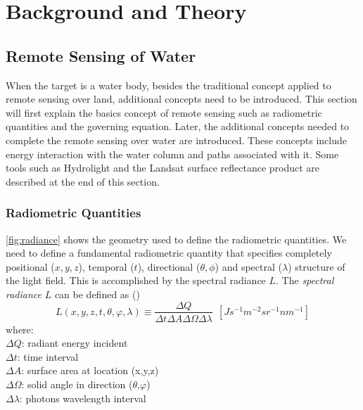 \chapter{Background and Theory}
\label{ch:background}
\section{Remote Sensing of Water}
When the target is a water body, besides the traditional concept applied to remote sensing over land, additional concepts need to be introduced. This section will first explain the basics concept of remote sensing such as radiometric quantities and the governing equation. Later, the additional concepts needed to complete the remote sensing over water are introduced. These concepts include energy interaction with the water column and paths associated with it. Some tools such as Hydrolight and the Landsat surface reflectance product are described at the end of this section.

\subsection{Radiometric Quantities}
\autoref{fig:radiance} shows the geometry used to define the radiometric quantities. We need to define a fundamental radiometric quantity that specifies completely positional ($x,y,z$), temporal ($t$), directional ($\theta,\phi$) and spectral ($\lambda$) structure of the light field. This is accomplished by the spectral radiance $L$. The {\it spectral radiance} $L$  can be defined as (\cite{Mobley:2001})
\begin{equation}\label{eq:rad1}
  L(x,y,z,t,\theta,\varphi,\lambda)\equiv\frac{\Delta Q}{\Delta t\Delta A\Delta\Omega\Delta\lambda}~~\left[ Js^{-1}m^{-2}sr^{-1}nm^{-1} \right]
\end{equation}
where:\\
      \noindent $\Delta Q$: radiant energy incident \\
      $\Delta t$: time interval \\
      $\Delta A$: surface area at location (x,y,z)\\
      $\Delta\Omega$: solid angle in direction ($\theta$,$\varphi$) \\
      $\Delta\lambda$: photons wavelength interval

